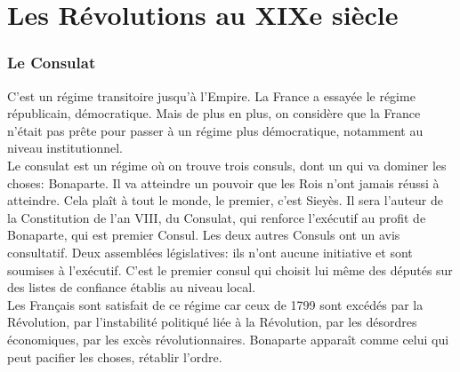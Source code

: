 \documentclass[10pt, a4paper, openany]{book}
\begin{document}
\part{Les Révolutions au XIXe siècle}

\section{Le Consulat}

C'est un régime transitoire jusqu'à l'Empire. La France a essayée le régime républicain, démocratique. Mais de plus en plus, on considère que la France n'était pas prête pour passer à un régime plus démocratique, notamment au niveau institutionnel. \\
Le consulat est un régime où on trouve trois consuls, dont un qui va dominer les choses: Bonaparte. Il va atteindre un pouvoir que les Rois n'ont jamais réussi à atteindre. Cela plaît à tout le monde, le premier, c'est Sieyès. Il sera l'auteur de la Constitution de l'an VIII, du Consulat, qui renforce l'exécutif au profit de Bonaparte, qui est premier Consul. Les deux autres Consuls ont un avis consultatif. Deux assemblées législatives: ils n'ont aucune initiative et sont soumises à l'exécutif. C'est le premier consul qui choisit lui même des députés sur des listes de confiance établis au niveau local. \\
Les Français sont satisfait de ce régime car ceux de 1799 sont excédés par la Révolution, par l'instabilité politiqué liée à la Révolution, par les désordres économiques, par les excès révolutionnaires. Bonaparte apparaît comme celui qui peut pacifier les choses, rétablir l'ordre. 
\end{document}
